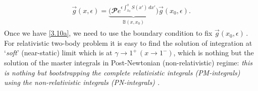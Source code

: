 \begin{align}
    \begin{split}
        \vec g(x,\epsilon)=\underbrace{\Bigg(\mathbfcal{P}e^{\epsilon\int_{x_0}^{x}S(x')\,dx'}\Bigg)}_{\mathbb{B}(x,x_0)}\vec g(x_0,\epsilon).\label{3.10a}
    \end{split}
\end{align}
Once we have \eqref{3.10a}, we need to use the boundary condition to fix $\vec g(x_0,\epsilon)\,.$ For relativistic two-body problem it is easy to find the solution of integration at `\textit{soft}' (near-static) limit which is at $\gamma\to 1^{+}\,(x\to 1^{-})$, which is nothing but the solution of the master integrals in Post-Newtonian (non-relativistic) regime: \textit{this is nothing but bootstrapping the complete relativistic integrals (PM-integrals) using the non-relativistic integrals (PN-integrals) \cite{Dlapa:2023hsl}.}

\par


